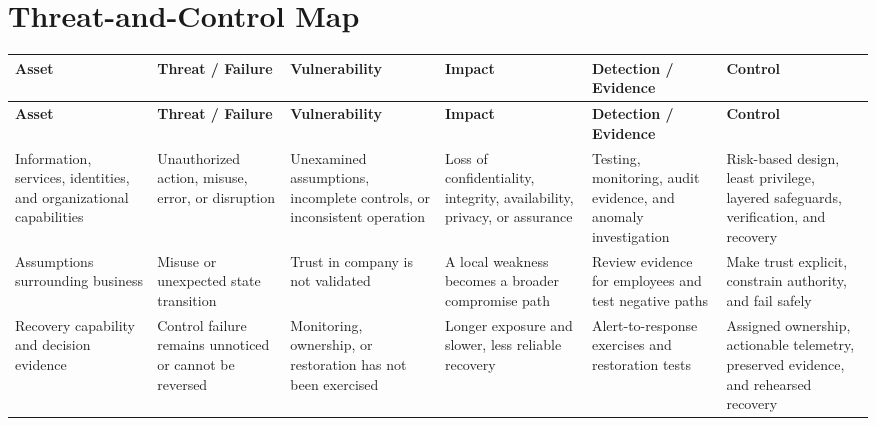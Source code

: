 \documentclass[11pt,letterpaper]{article}
\begin{document}
\section*{Threat-and-Control Map}
\begingroup\scriptsize\setlength{\tabcolsep}{2pt}
\begin{longtable}{>{\raggedright\arraybackslash}p{}>{\raggedright\arraybackslash}p{}>{\raggedright\arraybackslash}p{}>{\raggedright\arraybackslash}p{}>{\raggedright\arraybackslash}p{}>{\raggedright\arraybackslash}p{}}
\toprule\rowcolor{Navy}\color{white}\textbf{Asset} & \color{white}\textbf{Threat / Failure} & \color{white}\textbf{Vulnerability} & \color{white}\textbf{Impact} & \color{white}\textbf{Detection / Evidence} & \color{white}\textbf{Control}\\\midrule
\endfirsthead
\toprule\rowcolor{Navy}\color{white}\textbf{Asset} & \color{white}\textbf{Threat / Failure} & \color{white}\textbf{Vulnerability} & \color{white}\textbf{Impact} & \color{white}\textbf{Detection / Evidence} & \color{white}\textbf{Control}\\\midrule
\endhead
Information, services, identities, and organizational capabilities & Unauthorized action, misuse, error, or disruption & Unexamined assumptions, incomplete controls, or inconsistent operation & Loss of confidentiality, integrity, availability, privacy, or assurance & Testing, monitoring, audit evidence, and anomaly investigation & Risk-based design, least privilege, layered safeguards, verification, and recovery\\\midrule
Assumptions surrounding business & Misuse or unexpected state transition & Trust in company is not validated & A local weakness becomes a broader compromise path & Review evidence for employees and test negative paths & Make trust explicit, constrain authority, and fail safely\\\midrule
Recovery capability and decision evidence & Control failure remains unnoticed or cannot be reversed & Monitoring, ownership, or restoration has not been exercised & Longer exposure and slower, less reliable recovery & Alert-to-response exercises and restoration tests & Assigned ownership, actionable telemetry, preserved evidence, and rehearsed recovery\\\midrule
\bottomrule
\end{longtable}
\endgroup
\end{document}

